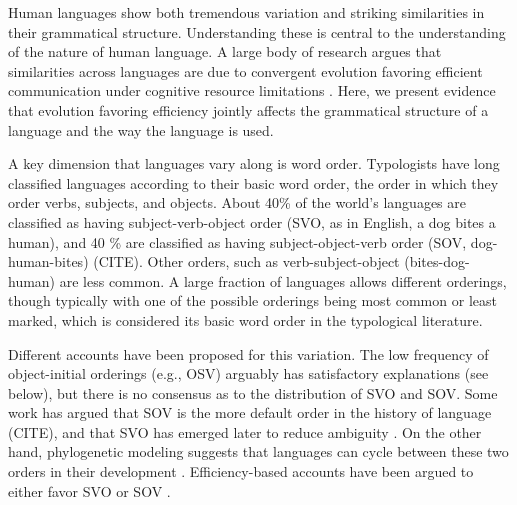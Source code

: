 \documentclass[11pt,a4paper]{article}
\newcommand\comment[1]{{\color{red}#1}}
\begin{document}





Human languages show both tremendous variation and striking similarities in their grammatical structure. Understanding these is central to the understanding of the nature of human language.
A large body of research argues that similarities across languages are due to convergent evolution favoring efficient communication under cognitive resource limitations \citep{haspelmath2008parametric}.
Here, we present evidence that evolution favoring efficiency jointly affects the grammatical structure of a language and the way the language is used.

A key dimension that languages vary along is word order.
Typologists have long classified languages according to their basic word order, the order in which they order verbs, subjects, and objects.
About 40\% of the world's languages are classified as having subject-verb-object order ({SVO}, as in English, a dog bites a human), and 40 \% are classified as having subject-object-verb order ({SOV}, dog-human-bites) (CITE).
Other orders, such as verb-subject-object (bites-dog-human) are less common.
A large fraction of languages allows different orderings, though typically with one of the possible orderings being most common or least marked, which is considered its basic word order in the typological literature.

Different accounts have been proposed for this variation.
The low frequency of object-initial orderings (e.g., OSV) arguably has satisfactory explanations (see below), but there is no consensus as to the distribution of SVO and SOV.
Some work has argued that SOV is the more default order in the history of language (CITE), and that SVO has emerged later to reduce ambiguity \citep{gibson-noisy-channel-2013}.
On the other hand, phylogenetic modeling suggests that languages can cycle between these two orders in their development \citep{maurits2014tracing}.
Efficiency-based accounts have been argued to either favor SVO or SOV \citep{maurits-why-2010, gibson-noisy-channel-2013, ferrer-i-cancho-placement-2017}.
\end{document}
